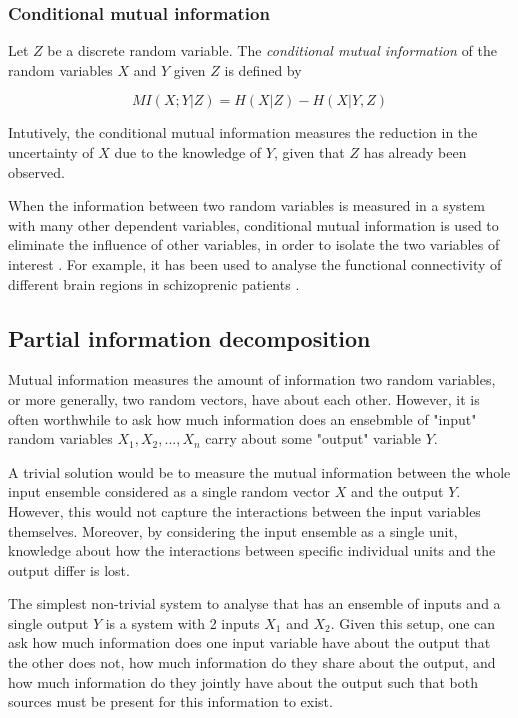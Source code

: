 \documentclass[12pt]{article}
\begin{document}
\subsubsection{Conditional mutual information}

Let $Z$ be a discrete random variable. The \textit{conditional mutual information} \cite{cover-thomas} of the random variables $X$ and $Y$ given $Z$ is defined by 

\begin{equation}
MI(X;Y|Z) = H(X|Z) - H(X|Y,Z)
\end{equation}

Intutively, the conditional mutual information measures the reduction in the uncertainty of $X$ due to the knowledge of $Y$, given that $Z$ has already been observed. 

When the information between two random variables is measured in a system with many other dependent variables, conditional mutual information is used to eliminate the influence of other variables, in order to isolate the two variables of interest \cite{williams-beer}. For example, it has been used to analyse the functional connectivity of different brain regions in schizoprenic patients \cite{brain-cond-inf}.

\subsection{Partial information decomposition}

Mutual information measures the amount of information two random variables, or more generally, two random vectors, have about each other. However, it is often worthwhile to ask how much information does an ensebmble of "input" random variables $X_1, X_2, ..., X_n$ carry about some "output" variable $Y$. 

A trivial solution would be to measure the mutual information between the whole input ensemble considered as a single random vector $X$ and the output $Y$. However, this would not capture the interactions between the input variables themselves. Moreover, by considering the input ensemble as a single unit, knowledge about how the interactions between specific individual units and the output differ is lost. 

The simplest non-trivial system to analyse that has an ensemble of inputs and a single output $Y$ is a system with 2 inputs $X_1$ and $X_2$. Given this setup, one can ask how much information does one input variable have about the output that the other does not, how much information do they share about the output, and how much information do they jointly have about the output such that both sources must be present for this information to exist.
\end{document}
